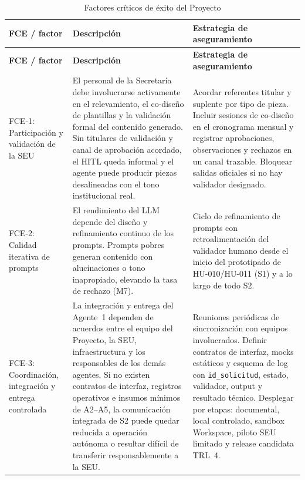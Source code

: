 \documentclass[a4paper, 12pt]{article}
\begin{document}
{\footnotesize
\begin{longtable}{L{0.22\textwidth}L{0.35\textwidth}L{0.35\textwidth}}
  \caption{Factores cr\'iticos de \'exito del Proyecto}
  \label{tab:factores-exito}\\
    \toprule
    \textbf{FCE / factor} & \textbf{Descripci\'on} & \textbf{Estrategia de aseguramiento} \\
    \midrule
    \endfirsthead
    \toprule
    \textbf{FCE / factor} & \textbf{Descripci\'on} & \textbf{Estrategia de aseguramiento} \\
    \midrule
    \endhead
    FCE-1: Participaci\'on y validaci\'on de la \ac{SEU} & El personal de la Secretar\'ia debe involucrarse activamente en el relevamiento, el co-dise\~no de plantillas y la validaci\'on formal del contenido generado. Sin titulares de validaci\'on y canal de aprobaci\'on acordado, el \ac{HITL} queda informal y el agente puede producir piezas desalineadas con el tono institucional real. & Acordar referentes titular y suplente por tipo de pieza. Incluir sesiones de co-dise\~no en el cronograma mensual y registrar aprobaciones, observaciones y rechazos en un canal trazable. Bloquear salidas oficiales si no hay validador designado. \\
    FCE-2: Calidad iterativa de prompts & El rendimiento del \ac{LLM} depende del dise\~no y refinamiento continuo de los prompts. Prompts pobres generan contenido con alucinaciones o tono inapropiado, elevando la tasa de rechazo (M7). & Ciclo de refinamiento de prompts con retroalimentaci\'on del validador humano desde el inicio del prototipado de HU-010/HU-011 (S1) y a lo largo de todo S2. \\
    FCE-3: Coordinaci\'on, integraci\'on y entrega controlada & La integraci\'on y entrega del Agente~1 dependen de acuerdos entre el equipo del Proyecto, la \ac{SEU}, infraestructura y los responsables de los dem\'as agentes. Si no existen contratos de interfaz, registros operativos e insumos m\'inimos de A2--A5, la comunicaci\'on integrada de S2 puede quedar reducida a operaci\'on aut\'onoma o resultar dif\'icil de transferir responsablemente a la \ac{SEU}. & Reuniones peri\'odicas de sincronizaci\'on con equipos involucrados. Definir contratos de interfaz, mocks est\'aticos y esquema de log con \texttt{id\_solicitud}, estado, validador, output y resultado t\'ecnico. Desplegar por etapas: documental, local controlado, sandbox Workspace, piloto \ac{SEU} limitado y release candidata \ac{TRL}~4. \\
    \bottomrule
\end{longtable}
}

\printbibliography[title={Referencias y bibliograf\'ia}]
\end{document}
